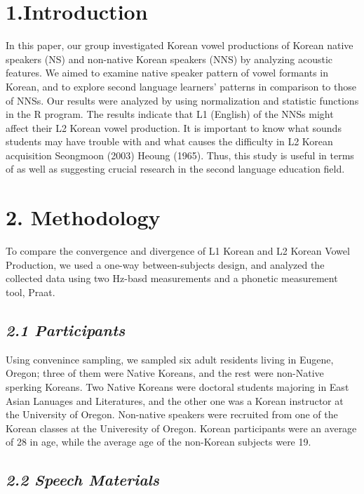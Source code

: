 \documentclass[man, fleqn, noextraspace]{apa6}
\begin{document}
\newpage

\section{\texorpdfstring{\textbf{1.Introduction}}{1.Introduction}}\label{introduction}

In this paper, our group investigated Korean vowel productions of Korean
native speakers (NS) and non-native Korean speakers (NNS) by analyzing
acoustic features. We aimed to examine native speaker pattern of vowel
formants in Korean, and to explore second language learners' patterns in
comparison to those of NNSs. Our results were analyzed by using
normalization and statistic functions in the R program. The results
indicate that L1 (English) of the NNSs might affect their L2 Korean
vowel production. It is important to know what sounds students may have
trouble with and what causes the difficulty in L2 Korean acquisition
Seongmoon (2003) Heoung (1965). Thus, this study is useful in terms of
as well as suggesting crucial research in the second language education
field.

\section{\texorpdfstring{\textbf{2.
Methodology}}{2. Methodology}}\label{methodology}

To compare the convergence and divergence of L1 Korean and L2 Korean
Vowel Production, we used a one-way between-subjects design, and
analyzed the collected data using two Hz-basd measurements and a
phonetic measurement tool, Praat.

\subsection{\texorpdfstring{\emph{2.1
Participants}}{2.1 Participants}}\label{participants}

Using convenince sampling, we sampled six adult residents living in
Eugene, Oregon; three of them were Native Koreans, and the rest were
non-Native sperking Koreans. Two Native Koreans were doctoral students
majoring in East Asian Lanuages and Literatures, and the other one was a
Korean instructor at the University of Oregon. Non-native speakers were
recruited from one of the Korean classes at the Univeresity of Oregon.
Korean participants were an average of 28 in age, while the average age
of the non-Korean subjects were 19.

\subsection{\texorpdfstring{\emph{2.2 Speech
Materials}}{2.2 Speech Materials}}\label{speech-materials}
\end{document}
